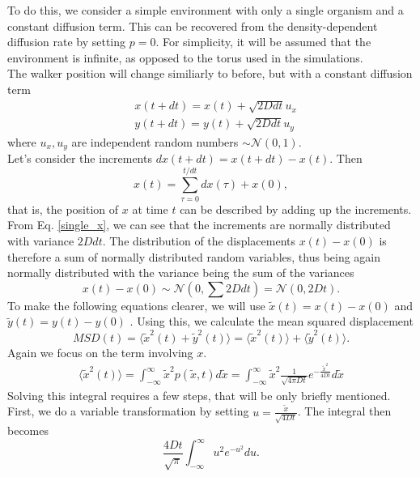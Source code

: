 \documentclass{article}
\begin{document}
To do this, we consider a simple environment with only a single organism and a constant diffusion term. 
This can be recovered from the density-dependent diffusion rate by setting $p=0$.
For simplicity, it will be assumed that the environment is infinite, as opposed to the torus used in the simulations.\\
The walker position will change similiarly to before, but with a constant diffusion term
\begin{align}
    & x(t + dt) = x(t) + \sqrt{2D dt} u_x \label{single_x}\\
    & y(t + dt) = y(t) + \sqrt{2D dt} u_y
\end{align}
where $u_x, u_y$ are independent random numbers $\sim \mathcal{N}(0,1)$.\\
Let's consider the increments $dx(t+dt) = x(t + dt) - x(t)$.
Then 
\begin{equation*}
    x(t) = \sum_{\tau = 0}^{t/dt} dx(\tau) + x(0),
\end{equation*}
that is, the position of $x$ at time $t$ can be described by adding up the increments.
From Eq. \ref{single_x}, we can see that the increments are normally distributed with variance $2D dt$.
The distribution of the displacements $x(t) - x(0)$ is therefore a sum of normally distributed random variables, thus being again normally distributed with the variance being the sum of the variances 
\begin{equation*}
    x(t) - x(0) \sim \mathcal{N}(0,\sum 2D dt) =  \mathcal{N}(0,2Dt).
\end{equation*}
To make the following equations clearer, we will use $\tilde{x}(t) = x(t)-x(0)$ and $\tilde{y}(t) = y(t)-y(0)$ .
Using this, we calculate the mean squared displacement 
\begin{equation*}
    MSD(t) = \langle \tilde{x}^2(t) +\tilde{y}^2(t) \rangle = \langle \tilde{x}^2(t)\rangle + \langle\tilde{y}^2(t) \rangle.
\end{equation*}
Again we focus on the term involving $x$.
\begin{align*}
    \langle \tilde{x}^2(t)\rangle = \int_{-\infty}^{\infty} \tilde{x}^2 p(\tilde{x},t)d\tilde{x} = \int_{-\infty}^{\infty} \tilde{x}^2 \frac{1}{\sqrt{4\pi Dt}} e^{-\frac{\tilde{x}^2}{4Dt}}d\tilde{x}
\end{align*}
Solving this integral requires a few steps, that will be only briefly mentioned. 
First, we do a variable transformation by setting $u = \frac{\tilde{x}}{\sqrt{4Dt}}$. 
The integral then becomes
\begin{equation*}
    \frac{4Dt}{\sqrt{\pi}}\int_{-\infty}^{\infty} u^2  e^{-u^2}du.
\end{equation*}
\end{document}
